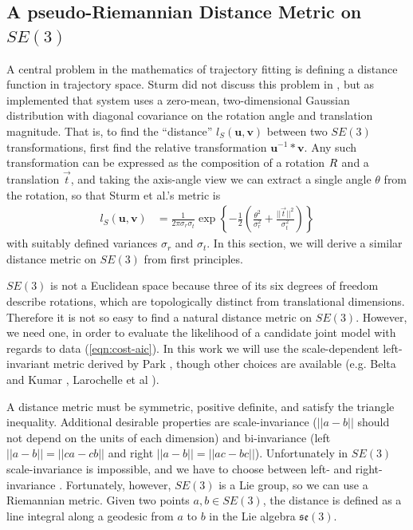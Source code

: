 \documentclass[a4paper,orivec]{llncs}
\def\xmat{\uppercase}    \def\xmatstr{in uppercase}
\def\xvec{\vec}          \def\xvecstr{with an arrow}
\def\xse{\bm}            \def\xsestr{in boldface}
\begin{document}
\subsection{A pseudo-Riemannian Distance Metric on $SE(3)$}\label{sec:metric}
A central problem in the mathematics of trajectory fitting is defining a distance function in trajectory space. Sturm did not discuss this problem in \cite{Sturm2011}, but as implemented that system uses a zero-mean, two-dimensional Gaussian distribution with diagonal covariance on the rotation angle and translation magnitude. That is, to find the ``distance'' $l_S(\xse{u},\xse{v})$ between two $SE(3)$ transformations, first find the relative transformation $\xse{u}^{-1}*\xse{v}$. Any such transformation can be expressed as the composition of a rotation $\xmat{r}$ and a translation $\xvec{t}$, and taking the axis-angle view we can extract a single angle $\theta$ from the rotation, so that Sturm et al.'s metric is
\begin{align}
  l_S(\xse{u},\xse{v}) &= \frac{1}{2\pi \sigma_r \sigma_t} \exp\left\{-\frac{1}{2}\left( \frac{\theta^2}{\sigma_r^2} + \frac{||\xvec{t}||^2}{\sigma_t^2} \right)\right\} \label{eqn:sturm-objective}
\end{align}
with suitably defined variances $\sigma_r$ and $\sigma_t$. In this section, we will derive a similar distance metric on $SE(3)$ from first principles.

$SE(3)$ is not a Euclidean space because three of its six degrees of freedom describe rotations, which are topologically distinct from translational dimensions. Therefore it is not so easy to find a natural distance metric on $SE(3)$. However, we need one, in order to evaluate the likelihood of a candidate joint model with regards to data (\ref{eqn:cost-aic}). In this work we will use the scale-dependent left-invariant metric derived by Park \cite{Park1995}, though other choices are available (e.g. Belta and Kumar \cite{Belta2002}, Larochelle et al \cite{Larochelle2007}).

A distance metric must be symmetric, positive definite, and satisfy the triangle inequality. Additional desirable properties are scale-invariance ($||a-b||$ should not depend on the units of each dimension) and bi-invariance (left $||a-b|| = ||ca-cb||$ and right $||a-b|| = ||ac-bc||$). Unfortunately in $SE(3)$ scale-invariance is impossible, and we have to choose between left- and right-invariance \cite{Park1995}. Fortunately, however, $SE(3)$ is a Lie group, so we can use a Riemannian metric. Given two points $a, b \in SE(3)$, the distance is defined as a line integral along a geodesic from $a$ to $b$ in the Lie algebra $\mathfrak{se}(3)$.
\end{document}
